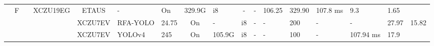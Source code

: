 \documentclass{article}
\begin{document}
\begin{table}
\begin{adjustbox}{totalheight=\baselineskip,}
\begin{tabular}{ccccclp{2em}cp{3em}cp{2em}p{4em}p{3em}p{3.5em}p{3.5em}p{2.5em}p{3em}}
       &\multirow{12}{*}{F}
           &\multirow{1}{*}{\cite{huangEdgeTrustworthyAI2024}}
               &\multirow{1}{*}{XCZU19EG}
                   &\multirow{1}{*}{ETAUS}
                       &\multirow{1}{*}{-}
                           &\multirow{1}{*}{On}
                               &\multirow{1}{*}{329.9G}
                                   &\multirow{1}{*}{i8}
                                       &\multirow{1}{*}{-}
                                           &\multirow{1}{*}{-}
                                               &\multirow{1}{*}{106.25}
                                                   &\multirow{1}{*}{329.90}
                                                       &\multirow{1}{*}{107.8 ms}
                                                           &\multirow{1}{*}{9.3}
                                                               &\multirow{1}{*}{1.65}\\
\cmidrule{4-17}
   &   &   &\multirow{1}{*}{\cite{liEdgeRealtimeObject2023a}}
               &\multirow{1}{*}{XCZU7EV}
                   &\multirow{1}{*}{RFA-YOLO}
                       &\multirow{1}{*}{24.75}
                           &\multirow{1}{*}{On}
                               &\multirow{1}{*}{-}
                                   &\multirow{1}{*}{i8}
                                       &\multirow{1}{*}{-}
                                           &\multirow{1}{*}{-}
                                               &\multirow{1}{*}{200}
                                                   &\multirow{1}{*}{-}
                                                       &\multirow{1}{*}{-}
                                                           &\multirow{1}{*}{27.97}
                                                               &\multirow{1}{*}{15.82}\\
\cmidrule{4-17}
   &   &   &\multirow{2}{*}{\cite{nguyenFPGASoCImplementationYOLOv42024}}
               &\multirow{2}{*}{XCZU7EV}
                   &\multirow{1}{*}{YOLOv4}
                       &\multirow{1}{*}{245}
                           &\multirow{1}{*}{On}
                               &\multirow{1}{*}{105.9G}
                                   &\multirow{1}{*}{i8}
                                       &\multirow{1}{*}{-}
                                           &\multirow{1}{*}{-}
                                               &\multirow{1}{*}{100}
                                                   &\multirow{1}{*}{-}
                                                       &\multirow{1}{*}{107.94 ms}
                                                           &\multirow{1}{*}{17.9}

\end{tabular}
\end{adjustbox}
\end{table}
\end{document}
